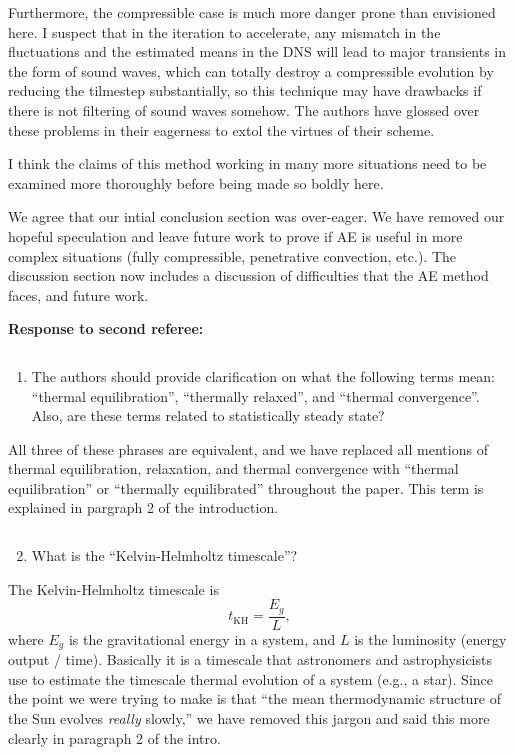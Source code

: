 \documentclass[aps, 11pt, singlecolumn]{revtex4-1} %
\begin{document}
\begin{singlespace}
\begin{myquotation}
Furthermore, the compressible case is much more danger prone than
envisioned here. I suspect that in the iteration to accelerate, any
mismatch in the fluctuations and the estimated means in the DNS will
lead to major transients in the form of sound waves, which can totally
destroy a compressible evolution by reducing the tilmestep
substantially, so this technique may have drawbacks if there is not
filtering of sound waves somehow. The authors have glossed over these
problems in their eagerness to extol the virtues of their scheme.

I think the claims of this method working in many more situations need
to be examined more thoroughly before being made so boldly here.
\end{myquotation}
We agree that our intial conclusion section was over-eager. We have removed
our hopeful speculation and leave future work to
prove if AE is useful in more complex situations (fully compressible,
penetrative convection, etc.). The discussion section now includes a discussion
of difficulties that the AE method faces, and future work.


\noindent
\Large{\textbf{Response to second referee:}}\newline$\,$\newline\indent
\begin{myquotation}
$\,$\\\vspace{-1.25cm}
\begin{enumerate}
\item The authors should provide clarification on what the following terms mean: ``thermal equilibration'', ``thermally relaxed'', and ``thermal convergence''. Also, are these terms related to statistically steady state?
\end{enumerate}
\end{myquotation}
All three of these phrases are equivalent, and we have replaced all mentions of
thermal equilibration, relaxation, and thermal convergence with ``thermal
equilibration'' or ``thermally equilibrated'' throughout the paper. This term
is explained in pargraph 2 of the introduction.
\begin{myquotation}
$\,$\\\vspace{-1.25cm}
\begin{enumerate}
\setcounter{enumi}{1}
\item What is the ``Kelvin-Helmholtz timescale''?
\end{enumerate}
\end{myquotation}
The Kelvin-Helmholtz timescale is 
$$
t_{\text{KH}} = \frac{E_g}{L},
$$
where $E_g$ is the gravitational energy in a system, and $L$ is the luminosity
(energy output / time). Basically it is a timescale that astronomers and
astrophysicists use to estimate the timescale thermal evolution of a system 
(e.g., a star). Since the point we were trying to make is that ``the mean 
thermodynamic structure of the Sun evolves \emph{really} slowly,''
we have removed this jargon and said this more clearly in paragraph 2 of the intro.


\end{singlespace}
\end{document}
